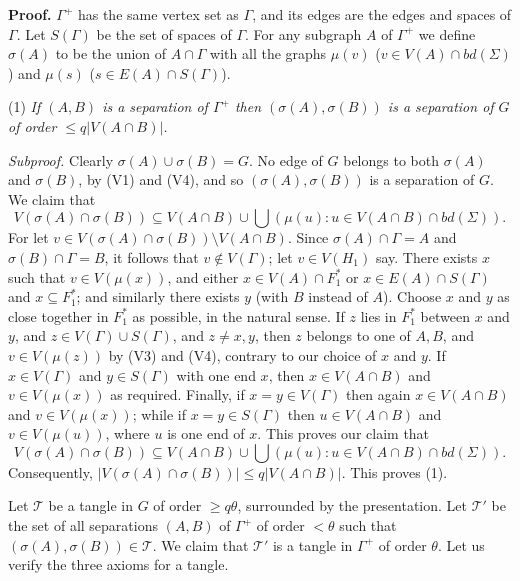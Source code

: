 \textbf{Proof.} $\Gamma^+$ has the same vertex set as $\Gamma$, and its edges are the edges and spaces of $\Gamma$. Let $S(\Gamma)$ be the set of spaces of $\Gamma$. For any subgraph $A$ of $\Gamma^+$ we define $\sigma(A)$ to be the union of $A \cap \Gamma$ with all the graphs $\mu(v)$ ($v \in V(A) \cap bd(\Sigma)$) and $\mu(s)$ ($s \in E(A) \cap S(\Gamma)$).

\hspace*{12pt}(1) \textit{If $(A, B)$ is a separation of $\Gamma^+$ then $(\sigma(A), \sigma(B))$ is a separation of $G$ of order $\le q|V(A \cap B)|$.}

\textit{Subproof.} Clearly $\sigma(A) \cup \sigma(B) = G$. No edge of $G$ belongs to both $\sigma(A)$ and $\sigma(B)$, by (V1) and (V4), and so $(\sigma(A), \sigma(B))$ is a separation of $G$. We claim that
\begin{equation*}
V(\sigma(A) \cap \sigma(B)) \subseteq V(A \cap B) \cup \bigcup (\mu(u) : u \in V(A \cap B) \cap bd(\Sigma)).
\end{equation*}
For let $v \in V(\sigma(A) \cap \sigma(B)) \setminus V(A \cap B)$. Since $\sigma(A) \cap \Gamma = A$ and $\sigma(B) \cap \Gamma = B$, it follows that $v \notin V(\Gamma)$; let $v \in V(H_1)$ say. There exists $x$ such that $v \in V(\mu(x))$, and either $x \in V(A) \cap F_1^*$ or $x \in E(A) \cap S(\Gamma)$ and $x \subseteq F_1^*$; and similarly there exists $y$ (with $B$ instead of $A$). Choose $x$ and $y$ as close together in $F_1^*$ as possible, in the natural sense. If $z$ lies in $F_1^*$ between $x$ and $y$, and $z \in V(\Gamma) \cup S(\Gamma)$, and $z \ne x, y$, then $z$ belongs to one of $A, B$, and $v \in V(\mu(z))$ by (V3) and (V4), contrary to our choice of $x$ and $y$. If $x \in V(\Gamma)$ and $y \in S(\Gamma)$ with one end $x$, then $x \in V(A \cap B)$ and $v \in V(\mu(x))$ as required. Finally, if $x = y \in V(\Gamma)$ then again $x \in V(A \cap B)$ and $v \in V(\mu(x))$; while if $x = y \in S(\Gamma)$ then $u \in V(A \cap B)$ and $v \in V(\mu(u))$, where $u$ is one end of $x$. This proves our claim that
\begin{equation*}
V(\sigma(A) \cap \sigma(B)) \subseteq V(A \cap B) \cup \bigcup (\mu(u) : u \in V(A \cap B) \cap bd(\Sigma)).
\end{equation*}
Consequently, $|V(\sigma(A) \cap \sigma(B))| \le q|V(A \cap B)|$. This proves (1).

Let $\mathcal{T}$ be a tangle in $G$ of order $\ge q\theta$, surrounded by the presentation. Let $\mathcal{T}'$ be the set of all separations $(A, B)$ of $\Gamma^+$ of order $< \theta$ such that $(\sigma(A), \sigma(B)) \in \mathcal{T}$. We claim that $\mathcal{T}'$ is a tangle in $\Gamma^+$ of order $\theta$. Let us verify the three axioms for a tangle.
